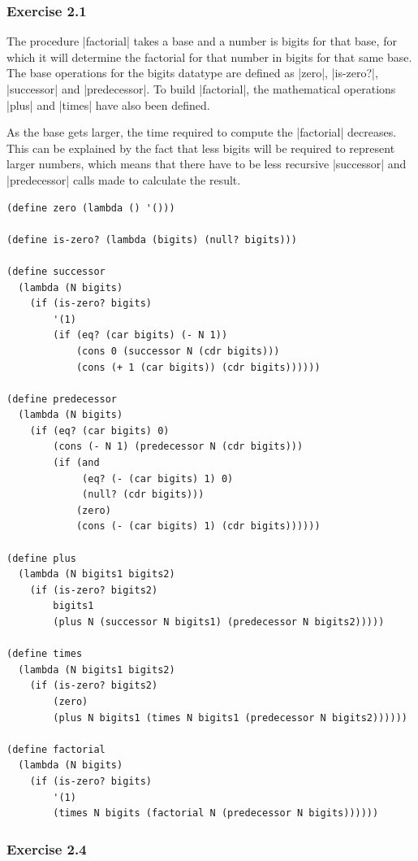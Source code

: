 \documentclass[a4paper]{article}
\begin{document}
\subsubsection{Exercise 2.1}

The procedure |factorial| takes a base and a number is bigits for that base, for which it will determine the factorial for that number in bigits for that same base. The base operations for the bigits datatype are defined as |zero|, |is-zero?|, |successor| and |predecessor|. To build |factorial|, the mathematical operations |plus| and |times| have also been defined.

As the base gets larger, the time required to compute the |factorial| decreases. This can be explained by the fact that less bigits will be required to represent larger numbers, which means that there have to be less recursive |successor| and |predecessor| calls made to calculate the result.

\begin{lstlisting}
(define zero (lambda () '()))

(define is-zero? (lambda (bigits) (null? bigits)))

(define successor
  (lambda (N bigits)
    (if (is-zero? bigits)
        '(1)
        (if (eq? (car bigits) (- N 1))
            (cons 0 (successor N (cdr bigits)))
            (cons (+ 1 (car bigits)) (cdr bigits))))))

(define predecessor
  (lambda (N bigits)
    (if (eq? (car bigits) 0)
        (cons (- N 1) (predecessor N (cdr bigits)))
        (if (and
             (eq? (- (car bigits) 1) 0)
             (null? (cdr bigits)))
            (zero)
            (cons (- (car bigits) 1) (cdr bigits))))))

(define plus
  (lambda (N bigits1 bigits2)
    (if (is-zero? bigits2)
        bigits1
        (plus N (successor N bigits1) (predecessor N bigits2)))))

(define times
  (lambda (N bigits1 bigits2)
    (if (is-zero? bigits2)
        (zero)
        (plus N bigits1 (times N bigits1 (predecessor N bigits2))))))

(define factorial
  (lambda (N bigits)
    (if (is-zero? bigits)
        '(1)
        (times N bigits (factorial N (predecessor N bigits))))))
\end{lstlisting}

\subsubsection{Exercise 2.4}
\end{document}
